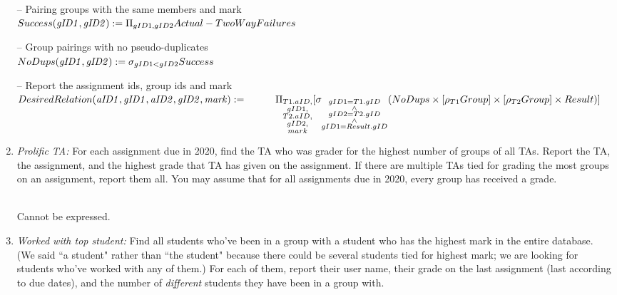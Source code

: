 \documentclass{article}
\newcommand{\var}[1]{\mathit{#1}}
\begin{document}
\begin{enumerate}
{-- Pairing groups with the same members and mark \\[5pt]
$
Success(\var{gID1, gID2}) :=
    \Pi_{gID1, gID2} Actual - TwoWayFailures \\[10pt]
$

-- Group pairings with no pseudo-duplicates \\[5pt]
$
NoDups(\var{gID1, gID2}) :=
    \sigma_{gID1 < gID2} Success \\[10pt]
$

-- Report the assignment ids, group ids and mark \\[5pt]
$
DesiredRelation(\var{aID1, gID1, aID2, gID2, mark}) := \\[5pt]
    \hspace*{1cm}
    \Pi_{\substack{T1.aID, \\ gID1, \\ T2.aID, \\ gID2, \\ mark}}
    [\sigma_{\substack{gID1 = T1.gID \\ \wedge \\ gID2 = T2.gID \\ \wedge \\ gID1 = Result.gID}}
    (NoDups \times [\rho_{T1} Group] \times [\rho_{T2} Group] \times Result)] \\[10pt]
$
} %

\newpage

\item   %
\textit{Prolific TA:}
For each assignment due in 2020, find the TA who was grader for the highest number of groups of all TAs.
Report the TA, the assignment, and the highest grade that TA has given on the assignment.
If there are multiple TAs tied for grading the most groups on an assignment, report them all.
You may assume that for all assignments due in 2020, every group has received a grade.

{~}\\ %
{\large %
Cannot be expressed. \\[10pt]
} %

\newpage

\item   %
\textit{Worked with top student:} 
Find all students who've been in a group with a student who has the highest mark in the entire database.
(We said ``a student" rather than ``the student" because there could be several students tied for highest mark;
we are looking for students who've worked with any of them.)
For each of them, report their user name, their grade on the last assignment
(last according to due dates), and the number of \textit{different} students they have been in a group with.


\end{enumerate}
\end{document}
